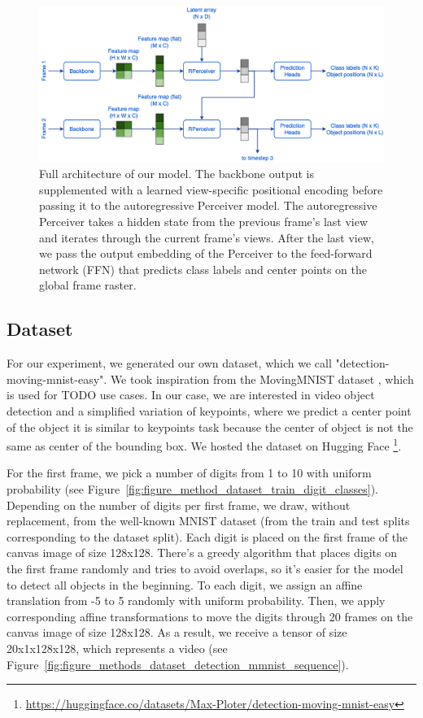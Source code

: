 \begin{figure}
    \centering
    \includegraphics[width=\textwidth]{figures/figure_methods_recurrent_perceiver_complete.png}
    \caption{Full architecture of our model. The backbone output is supplemented with a learned view-specific positional encoding before passing it to the autoregressive Perceiver model. The autoregressive Perceiver takes a hidden state from the previous frame's last view and iterates through the current frame's views. After the last view, we pass the output embedding of the Perceiver to the feed-forward network (FFN) that predicts class labels and center points on the global frame raster.}
    \label{fig:figure_methods_recurrent_perceiver_complete}
\end{figure}


\subsection{Dataset} \label{Methods:Dataset}

For our experiment, we generated our own dataset, which we call "detection-moving-mnist-easy". We took inspiration from the MovingMNIST dataset \cite{srivastava2016unsupervisedlearningvideorepresentations}, which is used for TODO use cases. In our case, we are interested in video object detection and a simplified variation of keypoints, where we predict a center point of the object it is similar to keypoints task because the center of object is not the same as center of the bounding box. We hosted the dataset on Hugging Face \footnote{\url{https://huggingface.co/datasets/Max-Ploter/detection-moving-mnist-easy}}.

 For the first frame, we pick a number of digits from 1 to 10 with uniform probability (see Figure~\ref{fig:figure_method_dataset_train_digit_classes}). Depending on the number of digits per first frame, we draw, without replacement, from the well-known MNIST dataset \cite{} (from the train and test splits corresponding to the dataset split). Each digit is placed on the first frame of the canvas image of size 128x128. There's a greedy algorithm that places digits on the first frame randomly and tries to avoid overlaps, so it's easier for the model to detect all objects in the beginning. To each digit, we assign an affine translation from -5 to 5 randomly with uniform probability. Then, we apply corresponding affine transformations to move the digits through 20 frames on the canvas image of size 128x128. As a result, we receive a tensor of size 20x1x128x128, which represents a video (see Figure~\ref{fig:figure_methods_dataset_detection_mmnist_sequence}).

